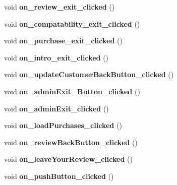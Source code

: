 \begin{DoxyCompactItemize}
\mbox{\label{class_main_window_aa636c03838477fad545819908f34d007}} 
void {\bfseries on\+\_\+review\+\_\+exit\+\_\+clicked} ()
\item 
\mbox{\label{class_main_window_a00bb1b9bcaecfb90604230bb8be0b2f2}} 
void {\bfseries on\+\_\+compatability\+\_\+exit\+\_\+clicked} ()
\item 
\mbox{\label{class_main_window_a560113571bb9394db779e191a8f9e346}} 
void {\bfseries on\+\_\+purchase\+\_\+exit\+\_\+clicked} ()
\item 
\mbox{\label{class_main_window_a6a67540278c1a486728f06aef2637387}} 
void {\bfseries on\+\_\+intro\+\_\+exit\+\_\+clicked} ()
\item 
\mbox{\label{class_main_window_ad645b24ad5d2c887d4e42306ef9d90b9}} 
void {\bfseries on\+\_\+update\+Customer\+Back\+Button\+\_\+clicked} ()
\item 
\mbox{\label{class_main_window_a319e4c96a5881fc79c623d330ed5d726}} 
void {\bfseries on\+\_\+admin\+Exit\+\_\+\+Button\+\_\+clicked} ()
\item 
\mbox{\label{class_main_window_a48f652d776074ffa13007c1198d515e2}} 
void {\bfseries on\+\_\+admin\+Exit\+\_\+clicked} ()
\item 
\mbox{\label{class_main_window_a3bc5c9344dfe2a113269663dfce3c0cc}} 
void {\bfseries on\+\_\+load\+Purchases\+\_\+clicked} ()
\item 
\mbox{\label{class_main_window_a2bb3daa29df6f17a15048f35930bdaea}} 
void {\bfseries on\+\_\+review\+Back\+Button\+\_\+clicked} ()
\item 
\mbox{\label{class_main_window_a50968124cfea882671979c9b9cd603db}} 
void {\bfseries on\+\_\+leave\+Your\+Review\+\_\+clicked} ()
\item 
\mbox{\label{class_main_window_a4de79c63c7fa0b8d7c468ac71f20be81}} 
void {\bfseries on\+\_\+push\+Button\+\_\+clicked} ()
\item 

\end{DoxyCompactItemize}
